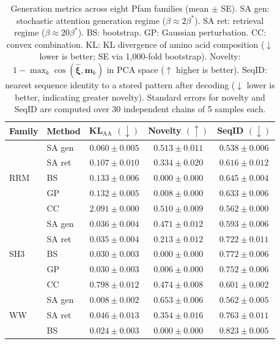 \begin{table}[ht]
\centering
\caption{Generation metrics across eight Pfam families (mean $\pm$ SE). SA gen: stochastic attention generation regime ($\beta \approx 2\beta^*$). SA ret: retrieval regime ($\beta \approx 20\beta^*$). BS: bootstrap. GP: Gaussian perturbation. CC: convex combination. KL: KL divergence of amino acid composition ($\downarrow$ lower is better; SE via 1{,}000-fold bootstrap). Novelty: $1 - \max_k\cos(\hat{\boldsymbol{\xi}}, \mathbf{m}_k)$ in PCA space ($\uparrow$ higher is better). SeqID: nearest sequence identity to a stored pattern after decoding ($\downarrow$ lower is better, indicating greater novelty). Standard errors for novelty and SeqID are computed over 30 independent chains of 5 samples each.}
\label{tab:results}
\small
\begin{tabular}{@{}llccc@{}}
\toprule
Family & Method & KL$_{\mathrm{AA}}$ $(\downarrow)$ & Novelty $(\uparrow)$ & SeqID $(\downarrow)$ \\
\midrule
\multirow{5}{*}{RRM}
 & SA gen  & $\mathbf{0.060 \pm 0.005}$ & $\mathbf{0.513 \pm 0.011}$ & $\mathbf{0.538 \pm 0.006}$ \\
 & SA ret  & $0.107 \pm 0.010$ & $0.334 \pm 0.020$ & $0.616 \pm 0.012$ \\
 & BS      & $0.133 \pm 0.006$ & $0.000 \pm 0.000$ & $0.645 \pm 0.004$ \\
 & GP      & $0.132 \pm 0.005$ & $0.008 \pm 0.000$ & $0.633 \pm 0.006$ \\
 & CC      & $2.091 \pm 0.000$ & $0.510 \pm 0.009$ & $0.562 \pm 0.000$ \\
\midrule
\multirow{5}{*}{SH3}
 & SA gen  & $0.036 \pm 0.004$ & $\mathbf{0.471 \pm 0.012}$ & $\mathbf{0.593 \pm 0.006}$ \\
 & SA ret  & $0.035 \pm 0.004$ & $0.213 \pm 0.012$ & $0.722 \pm 0.011$ \\
 & BS      & $\mathbf{0.030 \pm 0.003}$ & $0.000 \pm 0.000$ & $0.772 \pm 0.006$ \\
 & GP      & $\mathbf{0.030 \pm 0.003}$ & $0.006 \pm 0.000$ & $0.752 \pm 0.006$ \\
 & CC      & $0.798 \pm 0.012$ & $0.474 \pm 0.008$ & $0.601 \pm 0.002$ \\
\midrule
\multirow{5}{*}{WW}
 & SA gen  & $\mathbf{0.008 \pm 0.002}$ & $\mathbf{0.653 \pm 0.006}$ & $\mathbf{0.562 \pm 0.005}$ \\
 & SA ret  & $0.046 \pm 0.013$ & $0.354 \pm 0.016$ & $0.763 \pm 0.011$ \\
 & BS      & $0.024 \pm 0.003$ & $0.000 \pm 0.000$ & $0.823 \pm 0.005$ \\

\end{tabular}
\end{table}
